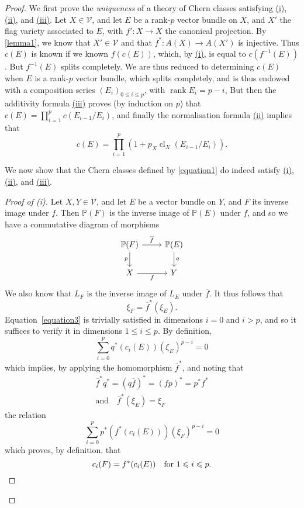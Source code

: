 \documentclass{article}
\theoremstyle{plain}
\theoremstyle{definition}
\newcommand{\cat}{\mathcal}
\renewcommand{\leq}{\leqslant}
\DeclareMathOperator{\rank}{rank}
\DeclareMathOperator{\cl}{cl}
\newcommand{\oldpage}[1]{\marginpar{\footnotesize$\Big\vert$ \textit{p.~#1}}}
\begin{document}
\begin{proof}
\oldpage{145}
  We first prove the \emph{uniqueness} of a theory of Chern classes satisfying \hyperref[theorem1i]{\rm{(i)}}, \hyperref[theorem1ii]{\rm{(ii)}}, and \hyperref[theorem1iii]{\rm{(iii)}}.
  Let $X\in\cat{V}$, and let $E$ be a rank-$p$ vector bundle on $X$, and $X'$ the flag variety associated to $E$, with $f'\colon X\to X$ the canonical projection.
  By \cref{lemma1}, we know that $X'\in\cat{V}$ and that $f^*\colon A(X)\to A(X')$ is injective.
  Thus $c(E)$ is known if we known $f(c(E))$, which, by \hyperref[theorem1i]{\rm{(i)}}, is equal to $c(f^{-1}(E))$.
  But $f^{-1}(E)$ splits completely.
  We are thus reduced to determining $c(E)$ when $E$ is a rank-$p$ vector bundle, which splits completely, and is thus endowed with a composition series $(E_i)_{0\leq i\leq p}$, with $\rank E_i=p-i$,
  But then the additivity formula \hyperref[theorem1iii]{\rm{(iii)}} proves (by induction on $p$) that $c(E)=\prod_{i=1}^p c(E_{i-1}/E_i)$, and finally the normalisation formula \hyperref[theorem1ii]{\rm{(ii)}} implies that
  \[
  \label{equation6}
    c(E) = \prod_{i=1}^p (1+p_X\cl_X(E_{i-1}/E_i)).
  \tag{6}
  \]

  We now show that the Chern classes defined by \cref{equation1} do indeed satisfy \hyperref[theorem1i]{\rm{(i)}}, \hyperref[theorem1ii]{\rm{(ii)}}, and \hyperref[theorem1iii]{\rm{(iii)}}.

  \begin{proof}[Proof of \rm{(i)}]
    Let $X,Y\in\cat{V}$, and let $E$ be a vector bundle on $Y$, and $F$ its inverse image under $f$.
    Then $\mathbb{P}(F)$ is the inverse image of $\mathbb{P}(E)$ under $f$, and so we have a commutative diagram of morphisms
    \[
      \begin{tikzcd}
        \mathbb{P}(F) \rar["\overline{f}"] \dar[swap,"p"]
        & \mathbb{P}(E) \dar["q"]
      \\X \rar[swap,"f"]
        & Y
      \end{tikzcd}
    \]
    We also know that $L_F$ is the inverse image of $L_E$ under $\overline{f}$.
    It thus follows that
    \[
      \xi_F = \overline{f}^*(\xi_E).
    \]
    Equation~\cref{equation3} is trivially satisfied in dimensions $i=0$ and $i>p$, and so it suffices to verify it in dimensions $1\leq i\leq p$.
    By definition,
    \[
      \sum_{i=0}^p q^*(c_i(E))(\xi_E)^{p-i} = 0
    \]
    which implies, by applying the homomorphism $\overline{f}^*$, and noting that
    \[
      \begin{gathered}
        \overline{f}^*q^* = (q\overline{f})^* = (fp)^* = p^*f^*
      \\\text{and}\quad\overline{f}^*(\xi_E) = \xi_F
      \end{gathered}
    \]
    the relation
    \[
      \sum_{i=0}^p p^*(f^*(c_i(E)))(\xi_F)^{p-i} = 0
    \]
\oldpage{146}
    which proves, by definition, that
    \[
      c_i(F) = f^*(c_i(E))
      \quad\mbox{for $1\leq i\leq p$.}\qedhere
    \]
  \end{proof}


\end{proof}
\end{document}
